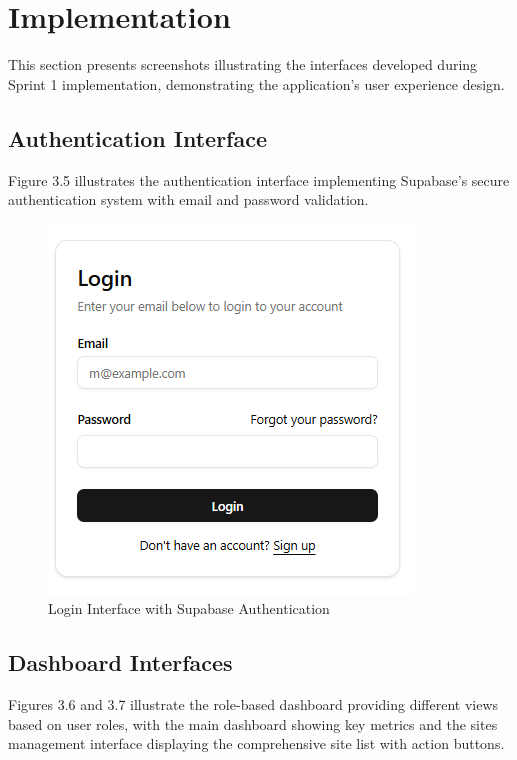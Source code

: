 \section{Implementation}

This section presents screenshots illustrating the interfaces developed during Sprint 1 implementation, demonstrating the application's user experience design.

\subsection{Authentication Interface}

Figure 3.5 illustrates the authentication interface implementing Supabase's secure authentication system with email and password validation.

\begin{figure}[H]
    \centering
    \includegraphics[width=0.7\linewidth]{img/chap_03/login_interface.png}
    \caption{Login Interface with Supabase Authentication}
    \label{fig:login_interface}
\end{figure}

\subsection{Dashboard Interfaces}

Figures 3.6 and 3.7 illustrate the role-based dashboard providing different views based on user roles, with the main dashboard showing key metrics and the sites management interface displaying the comprehensive site list with action buttons.

